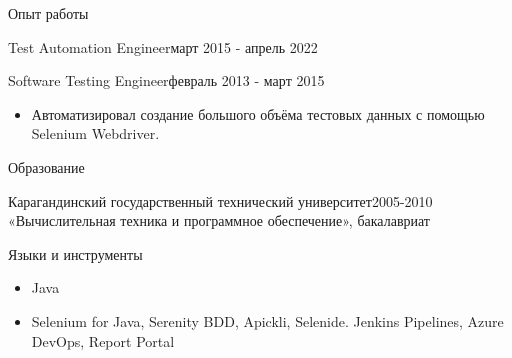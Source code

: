 \documentclass[]{mcdowellcv}
\begin{document}
\begin{cvsection}{Опыт работы}
\begin{cvsubsection}{Test Automation Engineer}{}{март 2015 - апрель 2022}
\begin{itemize}
			\end{itemize}
		\end{cvsubsection}
		\begin{cvsubsection}{Software Testing Engineer}{}{февраль 2013 - март 2015}
			\begin{itemize}
				\item Автоматизировал создание большого объёма тестовых данных с помощью Selenium Webdriver.
			\end{itemize}
		\end{cvsubsection}
	\end{cvsection}
	\begin{cvsection}{Образование}
		\begin{cvsubsection}{Карагандинский государственный технический университет}{}{2005-2010}
		«Вычислительная техника и программное обеспечение», бакалавриат
		\end{cvsubsection}
	\end{cvsection}	
	\begin{cvsection}{Языки и инструменты}
		\begin{cvsubsection}{}{}{}	
			\begin{itemize}
				\item Java
				\item Selenium for Java, Serenity BDD, Apickli, Selenide. Jenkins Pipelines, Azure DevOps, Report Portal
			\end{itemize}
		\end{cvsubsection}
	\end{cvsection}
	
\end{document}
